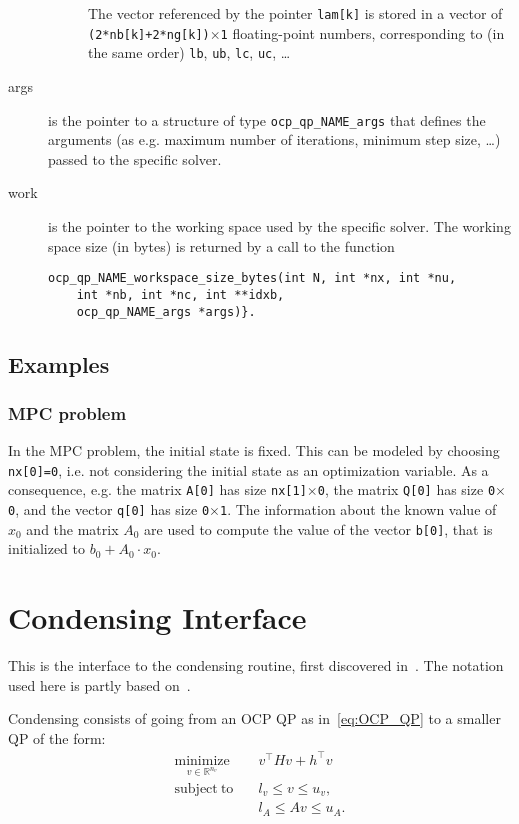 \documentclass{report}
\begin{document}
\begin{description}
\begin{description}
		The vector referenced by the pointer \texttt{lam[k]} is stored in a vector of \texttt{(2*nb[k]+2*ng[k])$\times$1} floating-point numbers, corresponding to (in the same order) \texttt{lb}, \texttt{ub}, \texttt{lc}, \texttt{uc}, \ldots
	\end{description}
	\item[args] is the pointer to a structure of type \texttt{ocp\_qp\_NAME\_args} that defines the arguments (as e.g. maximum number of iterations, minimum step size, \ldots) passed to the specific solver.
	\item[work] is the pointer to the working space used by the specific solver.
The working space size (in bytes) is returned by a call to the function 
\begin{verbatim}
ocp_qp_NAME_workspace_size_bytes(int N, int *nx, int *nu, 
    int *nb, int *nc, int **idxb, 
    ocp_qp_NAME_args *args)}. 
\end{verbatim}
\end{description}

\subsection{Examples}

\subsubsection{MPC problem}

In the MPC problem, the initial state is fixed.
This can be modeled by choosing \texttt{nx[0]=0}, i.e. not considering the initial state as an optimization variable.
As a consequence, e.g. the matrix \texttt{A[0]} has size \texttt{nx[1]$\times$0}, the matrix \texttt{Q[0]} has size \texttt{0$\times$0}, and the vector \texttt{q[0]} has size \texttt{0$\times$1}.
The information about the known value of $x_0$ and the matrix $A_0$ are used to compute the value of the vector \texttt{b[0]}, that is initialized to $b_0 + A_0 \cdot x_0$.

\section{Condensing Interface}

This is the interface to the condensing routine, first discovered in~\cite{Bock1984}. The notation used here is partly based on~\cite{Frasch2014a}.

Condensing consists of going from an OCP QP as in~\eqref{eq:OCP_QP} to a smaller QP of the form:
\begin{subequations}
	\label{eq:condensed_QP}
	\begin{alignat}{3}
	\underset{v \in \mathbb{R}^{n_v}}{\mathrm{minimize}} \quad & v^\top H v + h^\top v \\
	\mathrm{subject~to} \quad & l_v \leq v \leq u_v, \\
	& l_A \leq A v \leq u_A.
	\end{alignat}
\end{subequations}
\end{document}
